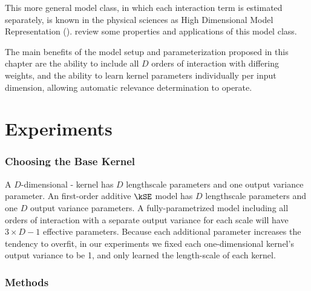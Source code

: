 
This more general model class, in which each interaction term is estimated separately, is known in the physical sciences as High Dimensional Model Representation (\HDMR{}).
\citet{rabitz1999general} review some properties and applications of this model class.

The main benefits of the model setup and parameterization proposed in this chapter are the ability to include all $D$ orders of interaction with differing weights, and the ability to learn kernel parameters individually per input dimension, allowing automatic relevance determination to operate.



\section{Experiments}
\label{sec:additive-experiments}

\subsubsection{Choosing the Base Kernel}
A $D$-dimensional \kSE-\ARD{} kernel has $D$ lengthscale parameters and one output variance parameter.
An first-order additive $\kSE$ model has $D$ lengthscale parameters and one $D$ output variance parameters.
A fully-parametrized model including all orders of interaction with a separate output variance for each scale will have $3 \times D - 1$ effective parameters.
Because each additional parameter increases the tendency to overfit, %
%
%
in our experiments we fixed each one-dimensional kernel's output variance to be 1, and only learned the length-scale of each kernel.



\subsubsection{Methods}

